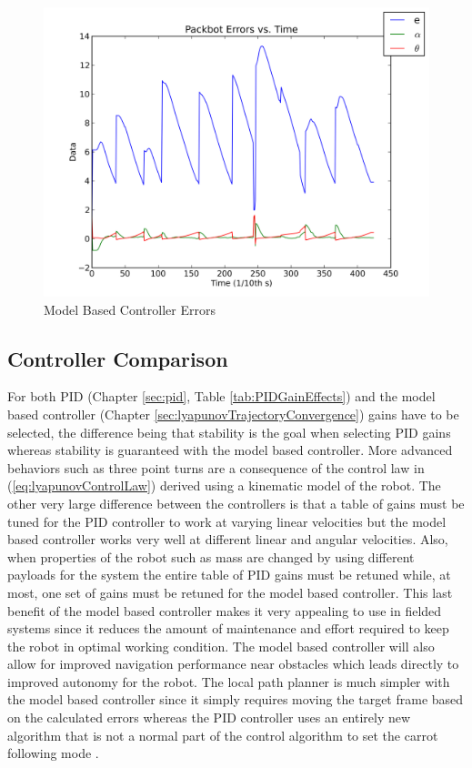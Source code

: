 \begin{figure}[ht!]
	\centering
	\includegraphics[width=.5\textwidth]{images/pbtx/20110109_1837_pbtx_simpleDriveErrors}
	\caption{Model Based Controller Errors}
	\label{fig:mbErrors}
\end{figure}

\subsection{Controller Comparison}
\label{sec:controllerComparison}
For both PID (Chapter \ref{sec:pid}, Table \ref{tab:PIDGainEffects}) and the model based controller (Chapter \ref{sec:lyapunovTrajectoryConvergence}) gains have to be selected, the difference being that stability is the goal when selecting PID gains whereas stability is guaranteed with the model based controller. More advanced behaviors such as three point turns are a consequence of the control law in (\ref{eq:lyapunovControlLaw}) derived using a kinematic model of the robot. The other very large difference between the controllers is that a table of gains must be tuned for the PID controller to work at varying linear velocities but the model based controller works very well at different linear and angular velocities. Also, when properties of the robot such as mass are changed by using different payloads for the system the entire table of PID gains must be retuned while, at most, one set of gains must be retuned for the model based controller. This last benefit of the model based controller makes it very appealing to use in fielded systems since it reduces the amount of maintenance and effort required to keep the robot in optimal working condition. The model based controller will also allow for improved navigation performance near obstacles which leads directly to improved autonomy for the robot. The local path planner is much simpler with the model based controller since it simply requires moving the target frame based on the calculated errors whereas the PID controller uses an entirely new algorithm that is not a normal part of the control algorithm to set the carrot following mode \cite{Hogg02}.

